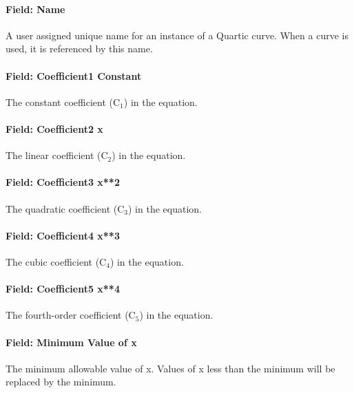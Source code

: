 \paragraph{Field: Name}\label{field-name-4-018}

A user assigned unique name for an instance of a Quartic curve. When a curve is used, it is referenced by this name.

\paragraph{Field: Coefficient1 Constant}\label{field-coefficient1-constant-4}

The constant coefficient (C\(_{1}\)) in the equation.

\paragraph{Field: Coefficient2 x}\label{field-coefficient2-x-3}

The linear coefficient (C\(_{2}\)) in the equation.

\paragraph{Field: Coefficient3 x**2}\label{field-coefficient3-x2-2}

The quadratic coefficient (C\(_{3}\)) in the equation.

\paragraph{Field: Coefficient4 x**3}\label{field-coefficient4-x3-1}

The cubic coefficient (C\(_{4}\)) in the equation.

\paragraph{Field: Coefficient5 x**4}\label{field-coefficient5-x4}

The fourth-order coefficient (C\(_{5}\)) in the equation.

\paragraph{Field: Minimum Value of x}\label{field-minimum-value-of-x-4}

The minimum allowable value of x. Values of x less than the minimum will be replaced by the minimum.

